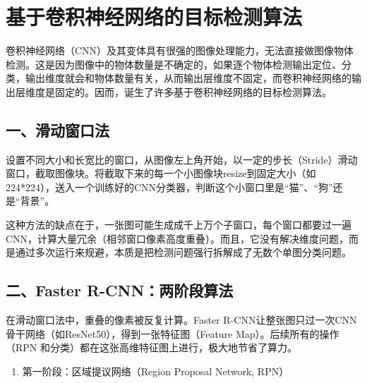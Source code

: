 \setcounter{section}{5}

\hypertarget{ux57faux4e8eux5377ux79efux795eux7ecfux7f51ux7edcux7684ux76eeux6807ux68c0ux6d4bux7b97ux6cd5}{%
\section{基于卷积神经网络的目标检测算法}\label{ux57faux4e8eux5377ux79efux795eux7ecfux7f51ux7edcux7684ux76eeux6807ux68c0ux6d4bux7b97ux6cd5}}

卷积神经网络（CNN）及其变体具有很强的图像处理能力，无法直接做图像物体检测。这是因为图像中的物体数量是不确定的，如果逐个物体检测输出定位、分类，输出维度就会和物体数量有关，从而输出层维度不固定，而卷积神经网络的输出层维度是固定的。因而，诞生了许多基于卷积神经网络的目标检测算法。

\hypertarget{ux4e00ux6ed1ux52a8ux7a97ux53e3ux6cd5}{%
\subsection{一、滑动窗口法}\label{ux4e00ux6ed1ux52a8ux7a97ux53e3ux6cd5}}

设置不同大小和长宽比的窗口，从图像左上角开始，以一定的步长（Stride）滑动窗口，截取图像块。将截取下来的每一个小图像块resize到固定大小（如224*224），送入一个训练好的CNN分类器，判断这个小窗口里是``猫''、``狗''还是``背景''。

这种方法的缺点在于，一张图可能生成成千上万个子窗口，每个窗口都要过一遍CNN，计算大量冗余（相邻窗口像素高度重叠）。而且，它没有解决维度问题，而是通过多次运行来规避，本质是把检测问题强行拆解成了无数个单图分类问题。

\hypertarget{ux4e8cfaster-r-cnnux4e24ux9636ux6bb5ux7b97ux6cd5}{%
\subsection{二、Faster R-CNN：两阶段算法}\label{ux4e8cfaster-r-cnnux4e24ux9636ux6bb5ux7b97ux6cd5}}

在滑动窗口法中，重叠的像素被反复计算。Faster R-CNN让整张图只过一次CNN骨干网络（如ResNet50），得到一张特征图（Feature Map）。后续所有的操作（RPN 和分类）都在这张高维特征图上进行，极大地节省了算力。

\begin{enumerate}
\def\labelenumi{\arabic{enumi}.}
\tightlist
\item
  第一阶段：区域提议网络（Region Proposal Network, RPN）
\end{enumerate}

